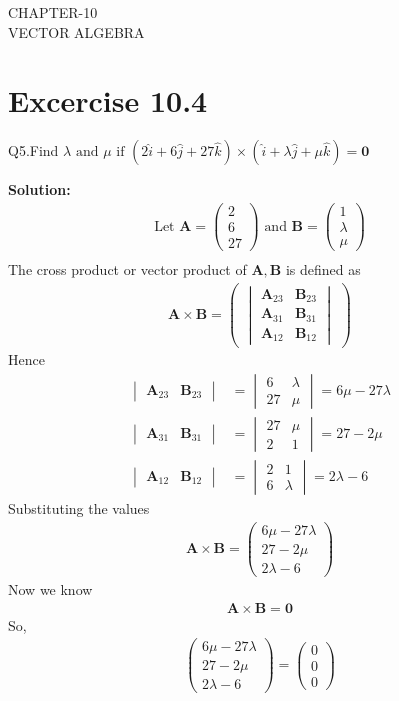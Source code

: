 \documentclass[12pt]{article}
\newcommand{\mydet}[1]{\ensuremath{\begin{vmatrix}#1\end{vmatrix}}}
\newcommand{\solution}{\noindent \textbf{Solution: }}
\newcommand{\myvec}[1]{\ensuremath{\begin{pmatrix}#1\end{pmatrix}}}
\let\vec\mathbf
\begin{document}
\begin{center}
\textbf\large{CHAPTER-10 \\ VECTOR ALGEBRA}

\end{center}
\section*{Excercise 10.4}

Q5.Find $\lambda \text{ and } \mu \text{ if } (2\hat{i}+6\hat{j}+27\hat{k}) \times (\hat{i}+\lambda \hat{j}+\mu \hat{k})=\vec{0}$

\solution
\begin{align}
	\text{Let } \vec{A} = \myvec{2\\6\\27} \text{ and } \vec{B} = \myvec{1\\ \lambda \\ \mu}\\
\end{align}
The cross product or vector product of $\vec{A},\vec{B}$ is defined as
\begin{align}
	\vec{A} \times \vec{B} = \myvec{\mydet{\vec{A}_{23}&\vec{B}_{23}\\\vec{A}_{31}&\vec{B}_{31}\\\vec{A}_{12}&\vec{B}_{12}}}
\end{align}
Hence
\begin{align}
	\mydet{\vec{A}_{23}&\vec{B}_{23}}&=\mydet{6&\lambda\\27&\mu}=6\mu-27\lambda\\
	\mydet{\vec{A}_{31}&\vec{B}_{31}}&=\mydet{27&\mu\\2&1}=27-2\mu\\
	\mydet{\vec{A}_{12}&\vec{B}_{12}}&=\mydet{2&1\\6&\lambda}=2\lambda-6
\end{align}
Substituting the values
\begin{align}
	\vec{A}\times\vec{B}=\myvec{6\mu-27\lambda\\27-2\mu\\2\lambda-6}
\end{align}
Now we know
\begin{align}
	\vec{A} \times \vec{B} = \vec{0}
\end{align}
So,
\begin{align}
	\myvec{6\mu-27\lambda\\27-2\mu\\2\lambda-6}=\myvec{0\\0\\0}
\end{align}
\end{document}
